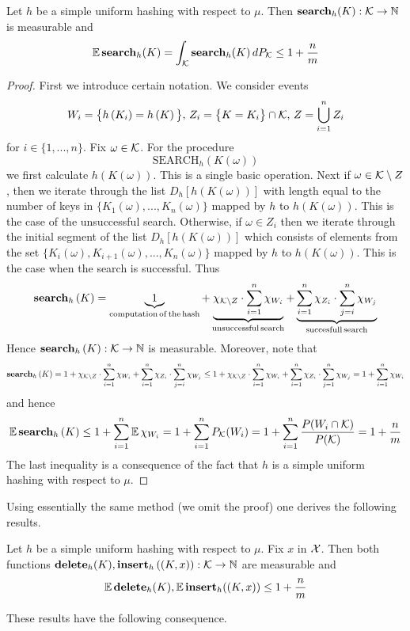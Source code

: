 \begin{theorem}\label{theorem:simple_uniform_hashing_expected_cost_for_search}
Let $h$ be a simple uniform hashing with respect to $\mu$. Then $\mathbf{search}_h(K):{\mathcal K}\rightarrow {\mathbb N}$ is measurable and
$$\mathbb{E}\,\mathbf{search}_h(K) = \int_{{\mathcal K}}\mathbf{search}_h(K)\,dP_{{\mathcal K}} \leq 1 + \frac{n}{m}$$
\end{theorem}
\begin{proof}
First we introduce certain notation. We consider events
$$W_{i} = \big\{h\left(K_i\right) = h\left(K\right)\big\},\,Z_i = \big\{K = K_i\big\}\cap {\mathcal K},\,Z = \bigcup_{i=1}^nZ_i$$
for $i\in \{1,...,n\}$. Fix $\omega \in {\mathcal K}$. For the procedure
$$\mathrm{SEARCH}_h(K(\omega))$$
we first calculate $h(K(\omega))$. This is a single basic operation. Next if $\omega \in {\mathcal K}\setminus Z$, then we iterate through the list $D_h[h(K(\omega))]$ with length equal to the number of keys in $\big\{K_1(\omega),...,K_n(\omega)\big\}$ mapped by $h$ to $h(K(\omega))$. This is the case of the unsuccessful search. Otherwise, if $\omega \in Z_i$ then we iterate through the initial segment of the list $D_h[h(K(\omega))]$ which consists of elements from the set $\big\{K_i(\omega),K_{i+1}(\omega),...,K_n(\omega)\big\}$ mapped by $h$ to $h(K(\omega))$. This is the case when the search is successful. Thus
$$\mathbf{search}_h\left(K\right) = \underbrace{1}_{\mathrm{computation\,of\,the\,hash}} + \underbrace{\chi_{{\mathcal K}\setminus Z}\cdot\sum_{i=1}^n \chi_{W_{i}}}_{\mathrm{unsuccessful\,search}} + \underbrace{\sum_{i=1}^n\chi_{Z_i}\cdot\sum_{j = i}^n \chi_{W_{j}}}_{\mathrm{succesfull\,search}}$$
Hence $\mathbf{search}_h\left(K\right):{\mathcal K}\rightarrow {\mathbb N}$ is measurable. Moreover, note that
$$\mathbf{search}_h\left(K\right) = 1 + \chi_{{\mathcal K}\setminus Z}\cdot \sum_{i=1}^n \chi_{W_{i}} + \sum_{i=1}^n\chi_{Z_i}\cdot\sum_{j = i}^n \chi_{W_{j}} \leq 1 + \chi_{{\mathcal K}\setminus Z}\cdot \sum_{i=1}^n \chi_{W_{i}} + \sum_{i=1}^n\chi_{Z_i}\cdot\sum_{j = 1}^n \chi_{W_{j}} = 1 +  \sum_{i=1}^n \chi_{W_{i}}$$
and hence
$$\mathbb{E}\,\mathbf{search}_h\left(K\right) \leq 1 +  \sum_{i=1}^n \mathbb{E}\,\chi_{W_{i}} = 1 + \sum_{i=1}^nP_{{\mathcal K}}(W_i) = 1 + \sum_{i=1}^n\frac{P(W_i\cap {\mathcal K})}{P({\mathcal K})} = 1 + \frac{n}{m}$$
The last inequality is a consequence of the fact that $h$ is a simple uniform hashing with respect to $\mu$.
\end{proof}
\noindent
Using essentially the same method (we omit the proof) one derives the following results.

\begin{theorem}\label{theorem:simple_uniform_hashing_expected_costs_of_delete_and_insert}
Let $h$ be a simple uniform hashing with respect to $\mu$. Fix $x$ in ${\mathcal X}$. Then both functions $\mathbf{delete}_h(K),\mathbf{insert}_h\left((K,x)\right):{\mathcal K}\rightarrow {\mathbb N}$ are measurable and
$$\mathbb{E}\,\mathbf{delete}_h(K), \mathbb{E}\,\mathbf{insert}_h((K,x))  \leq 1 + \frac{n}{m}$$
\end{theorem}
\noindent
These results have the following consequence.

